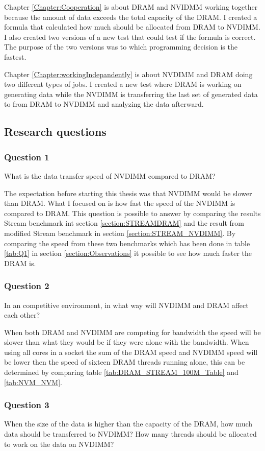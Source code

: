 \documentclass[12pt,a4paper,USenglish]{article}      %
\begin{document}
Chapter \ref{Chapter:Cooperation} is about DRAM and NVIDMM working together because the amount of data exceeds the total capacity of the DRAM.
I created a formula that calculated how much should be allocated from DRAM to NVDIMM. I also created two versions of a new test that could test if the formula is correct. The purpose of the two versions was to which programming decision is the fastest.

Chapter \ref{Chapter:workingIndepandently} is about NVDIMM and DRAM doing two different types of jobs. I created a new test where DRAM is working on generating data while the NVDIMM is transferring the last set of generated data to from DRAM to NVDIMM and analyzing the data afterward.

\pagebreak
\subsection{Research questions}
\subsubsection{Question 1}
What is the data transfer speed of NVDIMM compared to DRAM?

The expectation before starting this thesis was that NVDIMM would be slower than DRAM. What I focused on is how fast the speed of the NVDIMM is compared to DRAM. This question is possible to answer by comparing the results Stream  benchmark int section \ref{section:STREAMDRAM} and the result from modified Stream benchmark in section \ref{section:STREAM_NVDIMM}. By comparing the speed from these two benchmarks which has been done in table \ref{tab:Q1} in section \ref{section:Observations} it possible to see how much faster the DRAM is.

\subsubsection{Question 2}
In an competitive environment, in what way will NVDIMM and DRAM affect each other?

When both DRAM and NVDIMM are competing for bandwidth the speed will be slower than what they would be if they were alone with the bandwidth. When using all cores in a socket the sum of the DRAM speed and NVDIMM speed will be lower then the speed of sixteen DRAM threads running alone, this can be determined by comparing table \ref{tab:DRAM_STREAM_100M_Table} and \ref{tab:NVM_NVM}.

\subsubsection{Question 3}
When the size of the data is higher than the capacity of the DRAM, how much data should be transferred to NVDIMM? How many threads should be allocated to work on the data on NVDIMM?
\end{document}
